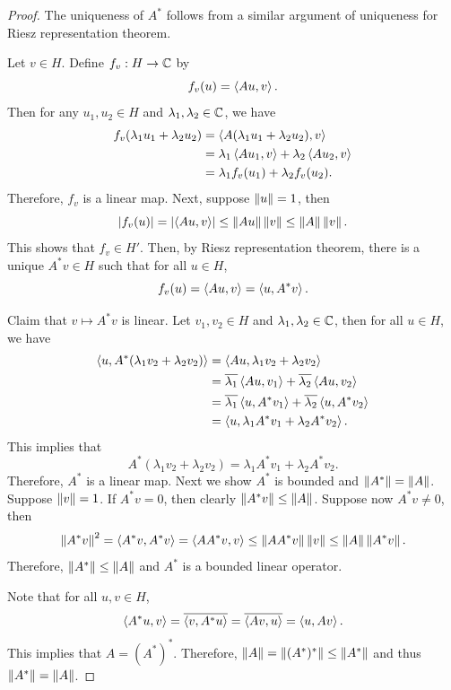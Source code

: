\documentclass[a4paper]{article}
\begin{document}
\begin{proof}
The uniqueness of $A^*$ follows from a similar argument 
of uniqueness for Riesz representation theorem. 

Let $v \in H$. Define $f_v : H \to \mathbb{C}$ by 
\[
f_v(u) = \left\langle A u, v \right\rangle.
\]
Then for any $u_1, u_2 \in H$ and $\lambda_1, \lambda_2 \in \mathbb{C}$,
we have 
\[
\begin{aligned}
  f_v(\lambda_1 u_1 + \lambda_2 u_2) 
  &= \left\langle A (\lambda_1 u_1 + \lambda_2 u_2), v \right\rangle \\
  &= \lambda_1 \left\langle A u_1, v \right\rangle + \lambda_2 \left\langle A u_2, v \right\rangle \\
  &= \lambda_1 f_v(u_1) + \lambda_2 f_v(u_2).
\end{aligned}
\]
Therefore, $f_v$ is a linear map. Next, 
suppose $\left\lVert u\right\rVert = 1$, then 
\[
\left\lvert f_v(u)\right\rvert = \left\lvert \left\langle Au, v \right\rangle\right\rvert 
\leq \left\lVert Au\right\rVert\left\lVert v\right\rVert \leq \left\lVert A\right\rVert \left\lVert v\right\rVert.
\]
This shows that $f_v \in H'$. Then, by Riesz
representation theorem, there is a unique $A^* v \in H$
such that for all $u \in H$, 
\[
f_v(u) = \left\langle Au, v \right\rangle = \left\langle u, A^* v \right\rangle.
\]

Claim that $v \mapsto A^* v$ is linear. Let $v_1, v_2 \in H$
and $\lambda_1, \lambda_2 \in \mathbb{C}$, then for all $u \in H$, 
we have 
\[
\begin{aligned}
  \left\langle u, A^*(\lambda_1 v_2 + \lambda_2 v_2) \right\rangle
  &= \left\langle Au, \lambda_1 v_2 + \lambda_2 v_2 \right\rangle \\
  &= \overline{\lambda_1} \left\langle Au, v_1 \right\rangle + \overline{\lambda_2} 
  \left\langle Au, v_2 \right\rangle \\
  &= \overline{\lambda_1} \left\langle u, A^* v_1 \right\rangle + \overline{\lambda_2} 
  \left\langle u, A^* v_2 \right\rangle \\
  &= \left\langle u, \lambda_1 A^* v_1 + \lambda_2 A^* v_2 \right\rangle.
\end{aligned}
\]
This implies that 
\[
  A^* (\lambda_1 v_2 + \lambda_2 v_2)
  = \lambda_1 A^* v_1 + \lambda_2 A^* v_2.
\]
Therefore, $A^*$ is a linear map. Next we show 
$A^*$ is bounded and $\left\lVert A^*\right\rVert = \left\lVert A\right\rVert$. Suppose 
$\left\lVert v\right\rVert = 1$. If $A^* v = 0$, then clearly $\left\lVert A^* v\right\rVert
\leq \left\lVert A\right\rVert$. Suppose now $A^* v \neq 0$, then 
\[
\left\lVert A^* v\right\rVert^2 = \left\langle A^* v, A^* v \right\rangle 
= \left\langle A A^* v, v \right\rangle \leq \left\lVert A A^* v\right\rVert \left\lVert v\right\rVert 
\leq \left\lVert A\right\rVert \left\lVert A^* v\right\rVert.
\]
Therefore, $\left\lVert A^*\right\rVert \leq \left\lVert A\right\rVert$ and $A^*$ is a bounded 
linear operator. 

Note that for all $u, v \in H$, 
\[
\left\langle A^* u, v \right\rangle = \overline{\left\langle v, A^* u \right\rangle} 
= \overline{\left\langle A v, u \right\rangle} = \left\langle u, A v \right\rangle.
\]
This implies that $A = \left( A^* \right)^*$. 
Therefore, $\left\lVert A\right\rVert = \left\lVert (A^*)^*\right\rVert \leq \left\lVert A^*\right\rVert$
and thus $\left\lVert A^*\right\rVert = \left\lVert A\right\rVert$.
\end{proof}
\end{document}
